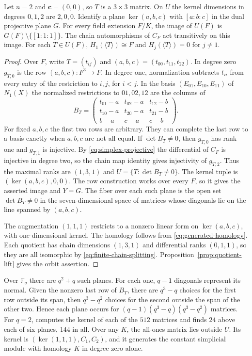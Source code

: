 \begin{proposition}\label{prop:three-by-three}
Let $n=2$ and $\mathbf c=(0,0)$, so $T$ is a $3\times3$ matrix. On $U$
the kernel dimensions in degrees $0,1,2$ are $2,0,0$. Identify a plane
$\ker(a,b,c)$ with $[a:b:c]$ in the dual projective plane $G$. For every
field extension $F/K$, the image of $U(F)$ is $G(F)\setminus\{[1:1:1]\}$.
The chain automorphisms of $C_F$ act transitively on this image.
For each $T\in U(F)$, $H_1(\langle T\rangle)\cong F$ and
$H_j(\langle T\rangle)=0$ for $j\ne1$.
\end{proposition}
\begin{proof}
Over $F$, write $T=(t_{ij})$ and $(a,b,c)=(t_{00},t_{11},t_{22})$.
In degree zero $g_{T,0}$ is the row $(a,b,c):F^3\to F$.
In degree one, normalization subtracts $t_{ii}$ from every entry of
the restriction to $i,j$, for $i<j$. In the basis $(E_{01},E_{10},E_{11})$
of $N_1(X)$ the normalized restrictions to $01,02,12$ are the columns of
\[
 B_T=\begin{pmatrix}
 t_{01}-a&t_{02}-a&t_{12}-b\\
 t_{10}-a&t_{20}-a&t_{21}-b\\
 b-a&c-a&c-b
 \end{pmatrix}.
\]
For fixed $a,b,c$ the first two rows are arbitrary. They can complete the
last row to a basis exactly when $a,b,c$ are not all equal. If $\det B_T\ne0$,
then $g_{T,0}$ has rank one and $g_{T,1}$ is injective.
By \eqref{eq:simplex-projective} the differential of $C_F$ is injective
in degree two, so the chain map identity gives injectivity of $g_{T,2}$.
Thus the maximal ranks are $(1,3,1)$ and $U=\{T:\det B_T\ne0\}$.
The kernel tuple is $(\ker(a,b,c),0,0)$. The row construction works over
every $F$, so it gives the asserted image and $Y=G$. The fiber over each such
plane is the open set $\det B_T\ne0$ in the seven-dimensional space of matrices
whose diagonals lie on the line spanned by $(a,b,c)$.

The augmentation $(1,1,1)$ restricts to a nonzero linear form on
$\ker(a,b,c)$, with one-dimensional kernel. The homology follows from
\eqref{eq:generated-homology}. Each quotient has chain dimensions $(1,3,1)$
and differential ranks $(0,1,1)$, so they are all isomorphic by \eqref{eq:finite-chain-splitting}.
Proposition~\ref{prop:quotient-lift} gives the orbit assertion.
\end{proof}

Over $\mathbb F_q$ there are $q^2+q$ such planes. For each one, $q-1$
diagonals represent its normal. Given the nonzero last row of $B_T$, there
are $q^3-q$ choices for the first row outside its span, then $q^3-q^2$
choices for the second outside the span of the other two. Hence each plane
occurs for $(q-1)(q^3-q)(q^3-q^2)$ matrices.
For $q=2$, 
computes the kernel of each of the $512$ matrices and finds $24$ above each
of six planes, $144$ in all. Over any $K$, the all-ones matrix lies outside $U$. Its kernel is
$(\ker(1,1,1),C_1,C_2)$, and it generates the constant simplicial module with homology
$K$ in degree zero alone.
